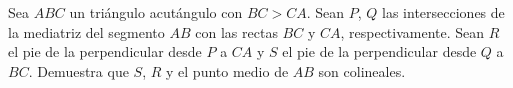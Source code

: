 Sea $ABC$ un triángulo acutángulo con $BC \gt CA$. Sean $P$, $Q$ las intersecciones de la mediatriz del segmento $AB$ con las rectas $BC$ y $CA$, respectivamente. Sean $R$ el pie de la perpendicular desde $P$ a $CA$ y $S$ el pie de la perpendicular desde $Q$ a $BC$. Demuestra que $S$, $R$ y el punto medio de $AB$ son colineales.
